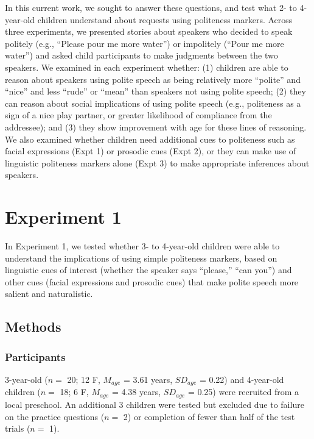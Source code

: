\documentclass[10pt, letterpaper]{article}
\begin{document}
In this current work, we sought to answer these questions, and test what
2- to 4-year-old children understand about requests using politeness
markers. Across three experiments, we presented stories about speakers
who decided to speak politely (e.g., ``Please pour me more water'') or
impolitely (``Pour me more water'') and asked child participants to make
judgments between the two speakers. We examined in each experiment
whether: (1) children are able to reason about speakers using polite
speech as being relatively more ``polite'' and ``nice'' and less
``rude'' or ``mean'' than speakers not using polite speech; (2) they can
reason about social implications of using polite speech (e.g.,
politeness as a sign of a nice play partner, or greater likelihood of
compliance from the addressee); and (3) they show improvement with age
for these lines of reasoning. We also examined whether children need
additional cues to politeness such as facial expressions (Expt 1) or
prosodic cues (Expt 2), or they can make use of linguistic politeness
markers alone (Expt 3) to make appropriate inferences about speakers.

\section{Experiment 1}\label{experiment-1}

In Experiment 1, we tested whether 3- to 4-year-old children were able
to understand the implications of using simple politeness markers, based
on linguistic cues of interest (whether the speaker says ``please,''
``can you'') and other cues (facial expressions and prosodic cues) that
make polite speech more salient and naturalistic.

\subsection{Methods}\label{methods}

\subsubsection{Participants}\label{participants}

3-year-old (\(n=\) 20; 12 F, \(M_{age}\) = 3.61 years, \(SD_{age}\) =
0.22) and 4-year-old children (\(n=\) 18; 6 F, \(M_{age}\) = 4.38 years,
\(SD_{age}\) = 0.25) were recruited from a local preschool. An
additional 3 children were tested but excluded due to failure on the
practice questions (\(n=\) 2) or completion of fewer than half of the
test trials (\(n=\) 1).
\end{document}
